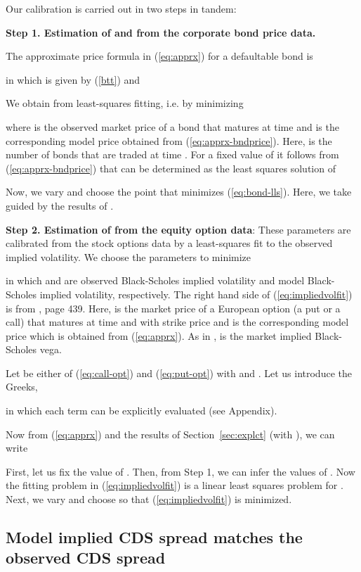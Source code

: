 \documentclass[11pt]{article}
\numberwithin{equation}{section}
\begin{document}
Our  calibration is carried out in two steps in tandem:


\noindent \textbf{Step 1. Estimation of  and
 from the corporate bond price data.}

The approximate price formula in (\ref{eq:apprx}) for a defaultable bond is

in which  is given by (\ref{btt}) and


 We obtain  from least-squares fitting, i.e. by minimizing

where  is the observed market price of a
bond that matures at time  and  is the corresponding model price obtained from (\ref{eq:apprx-bndprice}). Here,  is the number of bonds that are traded at time .
For a fixed value of 
 it follows from (\ref{eq:apprx-bndprice}) that  can be determined as the least squares solution of

Now, we vary  and choose the point
 that minimizes (\ref{eq:bond-lls}). Here, we take  guided by the results of \cite{papa}. 


\noindent \textbf{Step 2. Estimation of
 from the equity option data}:
These parameters are calibrated from the stock options data by a least-squares fit to the observed implied volatility. We choose the parameters to minimize

in which  and
 are observed
Black-Scholes implied volatility and model Black-Scholes implied
volatility, respectively. The right hand side of (\ref{eq:impliedvolfit}) is from \cite{cont}, page 439.
Here,
 is the market
price of a European option (a put or a call) that matures at time
 and with strike price  and
 is the
corresponding model price which is obtained from (\ref{eq:apprx}). As in \cite{cont},  is the market implied
Black-Scholes vega. 

Let  be either of (\ref{eq:call-opt}) and (\ref{eq:put-opt}) with  and .
Let us introduce the Greeks,

in which each term can be explicitly evaluated (see Appendix). 

Now from (\ref{eq:apprx}) and the results of Section~\ref{sec:explct} (with ), we can write

First, let us fix the value of . Then, from Step 1, we can infer the values of . Now
the fitting problem in (\ref{eq:impliedvolfit}) is a linear least squares problem for
.
Next, we vary  and choose 
 so that (\ref{eq:impliedvolfit}) is minimized. 

\subsection{Model implied CDS spread matches the observed CDS spread}
\end{document}
